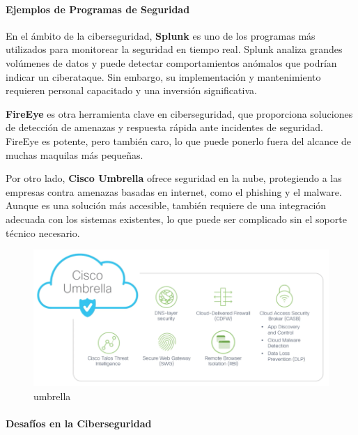 \documentclass[
  10pt,
  letterpaper,
]{book}
\let\oldparagraph\paragraph
\renewcommand{\paragraph}[1]{\oldparagraph{#1}\mbox{}}
\begin{document}
\paragraph{Ejemplos de Programas de
Seguridad}\label{ejemplos-de-programas-de-seguridad}

En el ámbito de la ciberseguridad, \textbf{Splunk} es uno de los
programas más utilizados para monitorear la seguridad en tiempo real.
Splunk analiza grandes volúmenes de datos y puede detectar
comportamientos anómalos que podrían indicar un ciberataque. Sin
embargo, su implementación y mantenimiento requieren personal capacitado
y una inversión significativa.

\textbf{FireEye} es otra herramienta clave en ciberseguridad, que
proporciona soluciones de detección de amenazas y respuesta rápida ante
incidentes de seguridad. FireEye es potente, pero también caro, lo que
puede ponerlo fuera del alcance de muchas maquilas más pequeñas.

Por otro lado, \textbf{Cisco Umbrella} ofrece seguridad en la nube,
protegiendo a las empresas contra amenazas basadas en internet, como el
phishing y el malware. Aunque es una solución más accesible, también
requiere de una integración adecuada con los sistemas existentes, lo que
puede ser complicado sin el soporte técnico necesario.

\begin{figure}[H]

{\centering \includegraphics{Img/cisco.png}

}

\caption{umbrella}

\end{figure}%

\paragraph{Desafíos en la
Ciberseguridad}\label{desafuxedos-en-la-ciberseguridad}
\end{document}
